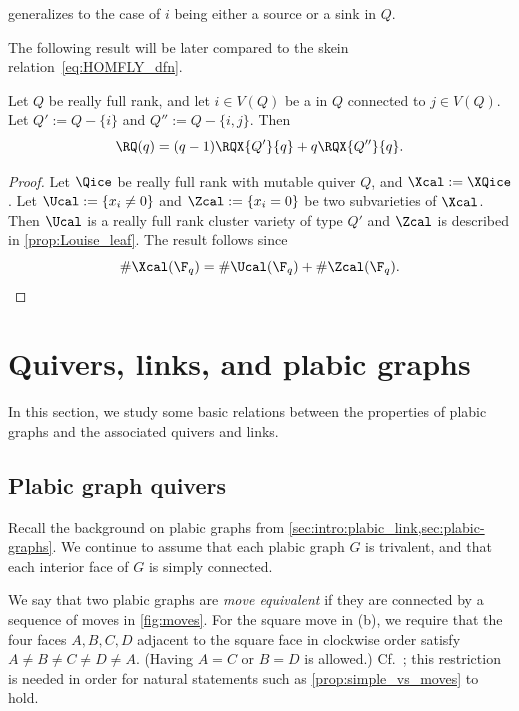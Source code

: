 \begin{remark}
 generalizes to the case of $i$ being either a source or a sink in $Q$.
\end{remark}
The following result will be later compared to the \FLY skein relation~\eqref{eq:HOMFLY_dfn}.
\begin{corollary}\label{cor:RQ_skein}
  Let $Q$ be really full rank, and let $i\in V(Q)$ be a \Louiseleaf in $Q$ connected to $j\in V(Q)$. Let $Q':=Q-\{i\}$ and $Q'':=Q-\{i,j\}$. Then
  \begin{equation}\label{eq:RQ_skein}
    \RQ(q)=(q-1)\RQX{Q'}{q} + q\RQX{Q''}{q}.
  \end{equation}
\end{corollary}
\begin{proof}
  Let $\Qice$ be really full rank with mutable quiver $Q$, and $\Xcal:=\XQice$. Let $\Ucal:=\{x_i\neq0\}$ and $\Zcal:=\{x_i=0\}$ be two subvarieties of $\Xcal$. Then $\Ucal$ is a really full rank cluster variety of type $Q'$ and $\Zcal$ is described in \cref{prop:Louise_leaf}. The result follows since
  \begin{equation*}%
    \#\Xcal(\F_q)=\#\Ucal(\F_q) + \#\Zcal(\F_q).    \qedhere
  \end{equation*}
\end{proof}

\section{Quivers, links, and plabic graphs}
In this section, we study some basic relations between the properties of plabic graphs and the associated quivers and links.

\subsection{Plabic graph quivers}\label{sec:plabquiver}
Recall the background on plabic graphs from \cref{sec:intro:plabic_link,sec:plabic-graphs}. We continue to assume that each plabic graph $G$ is trivalent, and that each interior face of $G$ is simply connected.
%
%
%
%
%
%
%
%
%
%
%
%

We say that two plabic graphs are \emph{move equivalent} if they are connected by a sequence of moves in \cref{fig:moves}. For the square move in (b), we require that the four faces $A,B,C,D$ adjacent to the square face in clockwise order satisfy $A\neq B\neq C\neq D\neq A$. (Having $A=C$ or $B=D$ is allowed.) Cf.~\cite[Restriction~6.3]{FPST}; this restriction is needed in order for natural statements such as \cref{prop:simple_vs_moves} to hold.

